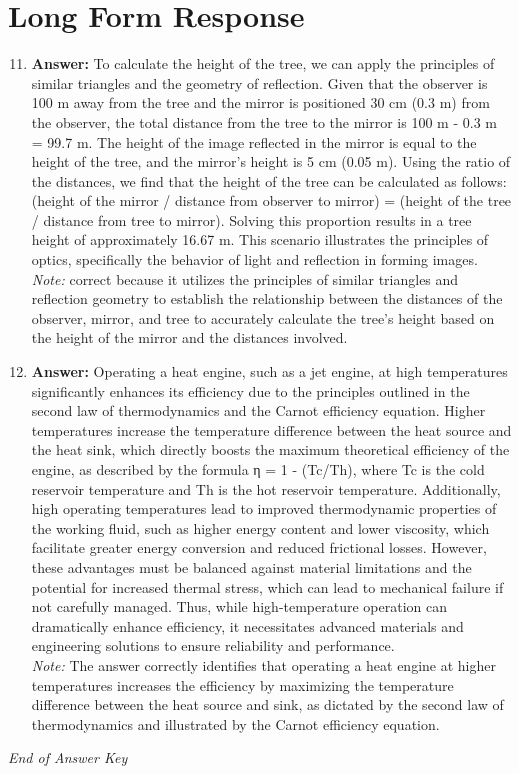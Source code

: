 \documentclass[12pt]{article}
\begin{document}
\section*{Long Form Response}
\begin{enumerate}[label=\arabic*.]
\setcounter{enumi}{10}
\item \textbf{Answer:} To calculate the height of the tree, we can apply the principles of similar triangles and the geometry of reflection. Given that the observer is 100 m away from the tree and the mirror is positioned 30 cm (0.3 m) from the observer, the total distance from the tree to the mirror is 100 m - 0.3 m = 99.7 m. The height of the image reflected in the mirror is equal to the height of the tree, and the mirror's height is 5 cm (0.05 m). Using the ratio of the distances, we find that the height of the tree can be calculated as follows: (height of the mirror / distance from observer to mirror) = (height of the tree / distance from tree to mirror). Solving this proportion results in a tree height of approximately 16.67 m. This scenario illustrates the principles of optics, specifically the behavior of light and reflection in forming images.
\\ \textit{Note:} correct because it utilizes the principles of similar triangles and reflection geometry to establish the relationship between the distances of the observer, mirror, and tree to accurately calculate the tree's height based on the height of the mirror and the distances involved.
\item \textbf{Answer:} Operating a heat engine, such as a jet engine, at high temperatures significantly enhances its efficiency due to the principles outlined in the second law of thermodynamics and the Carnot efficiency equation. Higher temperatures increase the temperature difference between the heat source and the heat sink, which directly boosts the maximum theoretical efficiency of the engine, as described by the formula η = 1 - (Tc/Th), where Tc is the cold reservoir temperature and Th is the hot reservoir temperature. Additionally, high operating temperatures lead to improved thermodynamic properties of the working fluid, such as higher energy content and lower viscosity, which facilitate greater energy conversion and reduced frictional losses. However, these advantages must be balanced against material limitations and the potential for increased thermal stress, which can lead to mechanical failure if not carefully managed. Thus, while high-temperature operation can dramatically enhance efficiency, it necessitates advanced materials and engineering solutions to ensure reliability and performance.
\\ \textit{Note:} The answer correctly identifies that operating a heat engine at higher temperatures increases the efficiency by maximizing the temperature difference between the heat source and sink, as dictated by the second law of thermodynamics and illustrated by the Carnot efficiency equation.
\end{enumerate}

\vfill
\noindent\textit{End of Answer Key}
\end{document}
